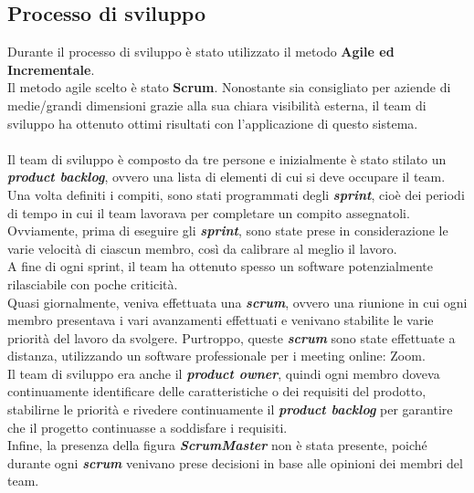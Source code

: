 \documentclass[a4paper,11pt]{article}
\begin{document}
\subsection{Processo di sviluppo}
Durante il processo di sviluppo è stato utilizzato il metodo \textbf{Agile ed Incrementale}.\\
Il metodo agile scelto è stato \textbf{Scrum}. Nonostante sia consigliato per aziende di medie/grandi dimensioni grazie alla sua chiara visibilità esterna, il team di sviluppo ha ottenuto ottimi risultati con l'applicazione di questo sistema.\\
\:\\
Il team di sviluppo è composto da tre persone e inizialmente è stato stilato un \textbf{\emph{product backlog}}, ovvero una lista di elementi di cui si deve occupare il team.\\
Una volta definiti i compiti, sono stati programmati degli \textbf{\emph{sprint}}, cioè dei periodi di tempo in cui il team lavorava per completare un compito assegnatoli. Ovviamente, prima di eseguire gli \textbf{\emph{sprint}}, sono state prese in considerazione le varie velocità di ciascun membro, così da calibrare al meglio il lavoro.\\
A fine di ogni sprint, il team ha ottenuto spesso un software potenzialmente rilasciabile con poche criticità.\\
Quasi giornalmente, veniva effettuata una \textbf{\emph{scrum}}, ovvero una riunione in cui ogni membro presentava i vari avanzamenti effettuati e venivano stabilite le varie priorità del lavoro da svolgere. Purtroppo, queste \textbf{\emph{scrum}} sono state effettuate a distanza, utilizzando un software professionale per i meeting online: Zoom.\\
Il team di sviluppo era anche il \textbf{\emph{product owner}}, quindi ogni membro doveva continuamente identificare delle caratteristiche o dei requisiti del prodotto, stabilirne le priorità e rivedere continuamente il \textbf{\emph{product backlog}} per garantire che il progetto continuasse a soddisfare i requisiti.\\
Infine, la presenza della figura \textbf{\emph{ScrumMaster}} non è stata presente, poiché durante ogni \textbf{\emph{scrum}} venivano prese decisioni in base alle opinioni dei membri del team.\\
\end{document}
